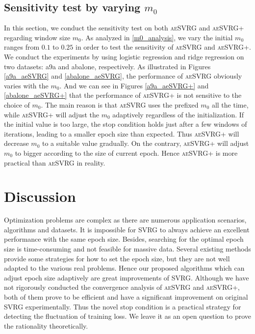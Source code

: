 \documentclass[conference]{IEEEtran}
\begin{document}
\subsection{Sensitivity test by varying  $m_0$}
In this section, we conduct the sensitivity test on both \textsc{aeSVRG} and \textsc{aeSVRG+} regarding window size $m_0$. As analyzed in \ref{m0_analysis}, we vary the initial $m_0$ ranges from $0.1$ to $0.25$ in order to test the sensitivity of \textsc{aeSVRG} and \textsc{aeSVRG+}. We conduct the experiments by using logistic regression and ridge regression on two datasets: a9a and abalone, respectively. As illustrated in Figures \ref{a9a_aeSVRG} and \ref{abalone_aeSVRG}, the performance of \textsc{aeSVRG} obviously varies with the $m_0$. And we can see in Figures \ref{a9a_aeSVRG+} and \ref{abalone_aeSVRG+} that the performance of \textsc{aeSVRG+} is not sensitive to the choice of $m_0$. 
The main reason is that \textsc{aeSVRG} uses the prefixed $m_0$ all the time, while \textsc{aeSVRG+} will adjust the $m_0$ adaptively regardless of the initialization.
If the initial value is too large, the stop condition holds just after a few windows of iterations, leading to a smaller epoch size than expected.
Thus \textsc{aeSVRG+} will decrease $m_0$ to a suitable value gradually. On the contrary, \textsc{aeSVRG+} will adjust $m_0$ to bigger according to the size of current epoch.  
Hence \textsc{aeSVRG+} is more practical than \textsc{aeSVRG} in reality.

\section{Discussion}
\label{discussion}
Optimization problems are complex as there are numerous application scenarios, algorithms and datasets. It is impossible for SVRG to always achieve an excellent performance with the same epoch size. Besides, searching for the optimal epoch size is time-consuming and not feasible for massive data. Several existing methods provide some strategies for how to set the epoch size, but they are not well adapted to the various real problems. Hence our proposed algorithms which can adjust epoch size adaptively are great improvements of SVRG. Although we have not rigorously conducted the convergence analysis of \textsc{aeSVRG} and \textsc{aeSVRG+}, both of them prove to be efficient and have a significant improvement on original SVRG experimentally. Thus the novel stop condition is a practical strategy for detecting the fluctuation of training loss. We leave it as an open question to prove the rationality theoretically.
\end{document}
